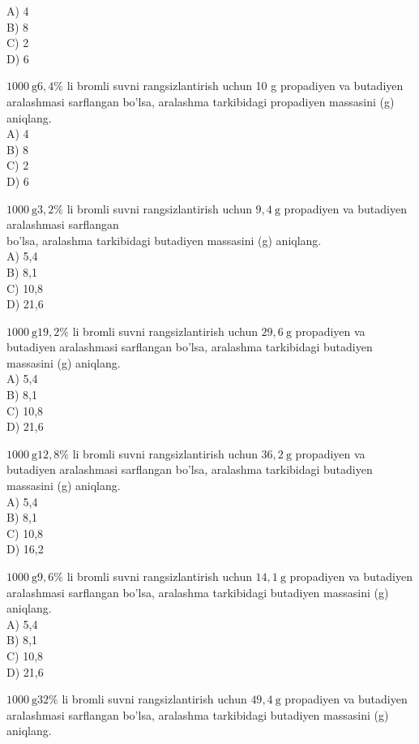 A) 4\\
B) 8\\
C) 2\\
D) 6
  \item $1000 \mathrm{~g} 6,4 \%$ li bromli suvni rangsizlantirish uchun 10 g propadiyen va butadiyen aralashmasi sarflangan bo'lsa, aralashma tarkibidagi propadiyen massasini (g) aniqlang.\\
A) 4\\
B) 8\\
C) 2\\
D) 6
  \item $1000 \mathrm{~g} 3,2 \%$ li bromli suvni rangsizlantirish uchun $9,4 \mathrm{~g}$ propadiyen va butadiyen aralashmasi sarflangan\\
bo'lsa, aralashma tarkibidagi butadiyen massasini (g) aniqlang.\\
A) 5,4\\
B) 8,1\\
C) 10,8\\
D) 21,6
  \item $1000 \mathrm{~g} 19,2 \%$ li bromli suvni rangsizlantirish uchun $29,6 \mathrm{~g}$ propadiyen va butadiyen aralashmasi sarflangan bo'lsa, aralashma tarkibidagi butadiyen massasini (g) aniqlang.\\
A) 5,4\\
B) 8,1\\
C) 10,8\\
D) 21,6
  \item $1000 \mathrm{~g} 12,8 \%$ li bromli suvni rangsizlantirish uchun $36,2 \mathrm{~g}$ propadiyen va butadiyen aralashmasi sarflangan bo'lsa, aralashma tarkibidagi butadiyen massasini (g) aniqlang.\\
A) 5,4\\
B) 8,1\\
C) 10,8\\
D) 16,2
  \item $1000 \mathrm{~g} 9,6 \%$ li bromli suvni rangsizlantirish uchun $14,1 \mathrm{~g}$ propadiyen va butadiyen aralashmasi sarflangan bo'lsa, aralashma tarkibidagi butadiyen massasini (g) aniqlang.\\
A) 5,4\\
B) 8,1\\
C) 10,8\\
D) 21,6
  \item $1000 \mathrm{~g} 32 \%$ li bromli suvni rangsizlantirish uchun $49,4 \mathrm{~g}$ propadiyen va butadiyen aralashmasi sarflangan bo'lsa, aralashma tarkibidagi butadiyen massasini (g) aniqlang.\\
